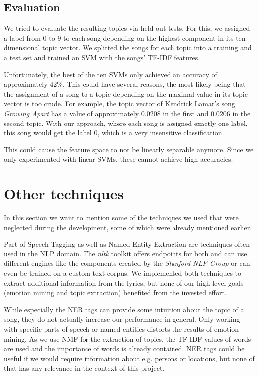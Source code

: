 \documentclass[10pt,a4paper]{article}
\begin{document}
		\subsection{Evaluation}
		We tried to evaluate the resulting topics via held-out tests. For this, we assigned a label from $0$ to $9$ to each song depending on the highest component in its ten-dimensional topic vector. We splitted the songs for each topic into a training and a test set and trained an SVM with the songs' TF-IDF features.
		
		Unfortunately, the best of the ten SVMs only achieved an accuracy of approximately 42\%. This could have several reasons, the most likely being that the assignment of a song to a topic depending on the maximal value in its topic vector is too crude. For example, the topic vector of Kendrick Lamar's song \textit{Growing Apart} has a value of approximately $0.0208$ in the first and $0.0206$ in the second topic. With our approach, where each song is assigned exactly one label, this song would get the label $0$, which is a very insensitive classification.
		
		This could cause the feature space to not be linearly separable anymore. Since we only experimented with linear SVMs, these cannot achieve high accuracies.
	
	\section{Other techniques}
	\label{sec:othertechniques}
	In this section we want to mention some of the techniques we used that were neglected during the development, some of which were already mentioned earlier. %
	
	Part-of-Speech Tagging as well as Named Entity Extraction are techniques often used in the NLP domain. The \textit{nltk} toolkit offers endpoints for both and can use different engines like the components created by the \textit{Stanford NLP Group} or can even be trained on a custom text corpus. We implemented both techniques to extract additional information from the lyrics, but none of our high-level goals (emotion mining and topic extraction) benefited from the invested effort. 
	
	While especially the NER tags can provide some intuition about the topic of a song, they do not actually increase our performance in general. Only working with specific parts of speech or named entities distorts the results of emotion mining. As we use NMF for the extraction of topics, the TF-IDF values of words are used and the importance of words is already contained. NER tags could be useful if we would require information about e.g. persons or locations, but none of that has any relevance in the context of this project.
	
\end{document}
